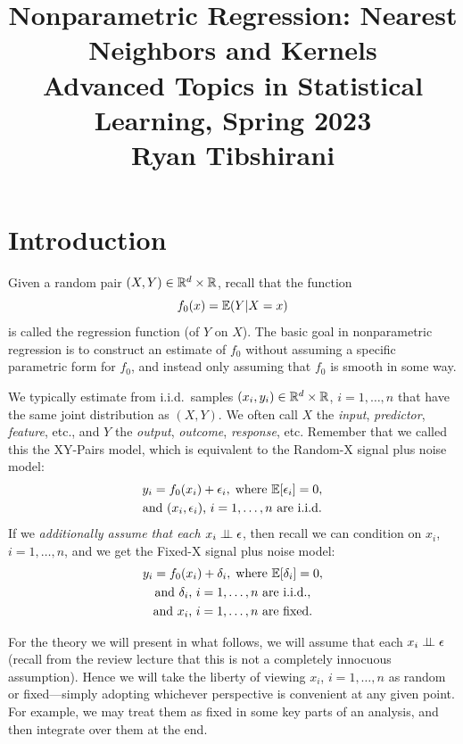 \documentclass{article}
\title{Nonparametric Regression: Nearest Neighbors and Kernels \\ \smallskip 
\large Advanced Topics in Statistical Learning, Spring 2023 \\ \smallskip
Ryan Tibshirani}
\author{}
\date{}
\begin{document}
\maketitle
\RaggedRight
\vspace{-50pt}

\section{Introduction}

Given a random pair $(X,Y) \in \mathbb{R}^d \times \mathbb{R}$, recall that the function 
\[
 f_0(x) = \mathbb{E}(Y|X=x) 
\]
is called the regression function (of $Y$ on $X$).  The basic goal in
nonparametric regression is to construct an estimate \smash{$\hf$} of $f_0$ 
without assuming a specific parametric form for $f_0$, and instead only assuming 
that $f_0$ is smooth in some way.

We typically estimate \smash{$\hf$} from i.i.d.\ samples $(x_i,y_i) \in \mathbb{R}^d
\times \mathbb{R}$, $i=1,\dots,n$ that have the same joint distribution as $(X,Y)$. We 
often call $X$ the \emph{input}, \emph{predictor}, \emph{feature}, etc., and $Y$
the \emph{output}, \emph{outcome}, \emph{response}, etc. Remember that we called
this the XY-Pairs model, which is equivalent to the Random-X signal plus noise
model:  
\begin{gather*}
\label{eq:random_x}
y_i = f_0(x_i) + \epsilon_i, \; \text{where $\mathbb{E}[\epsilon_i] = 0$}, \\
\text{and $(x_i, \epsilon_i)$, $i=1,\dots,n$ are i.i.d.}
\end{gather*} 
If we \emph{additionally assume that each $x_i \perp\!\!\!\perp \epsilon$}, then recall we 
can condition on $x_i$, $i=1,\dots,n$, and we get the Fixed-X signal plus noise
model:  
\begin{gather*}
y_i = f_0(x_i) + \delta_i, \; \text{where $\mathbb{E}[\delta_i] = 0$}, \\
\text{and $\delta_i$, $i=1,\dots,n$ are i.i.d.}, \\  
\text{and $x_i$, $i=1,\dots,n$ are fixed.}   
\end{gather*}

For the theory we will present in what follows, we will assume that each $x_i
\perp\!\!\!\perp \epsilon$ (recall from the review lecture that this is not a completely
innocuous assumption). Hence we will take the liberty of viewing $x_i$,
$i=1,\dots,n$ as random or fixed---simply adopting whichever perspective is
convenient at any given point. For example, we may treat them as fixed in some
key parts of an analysis, and then integrate over them at the end.    
\end{document}
